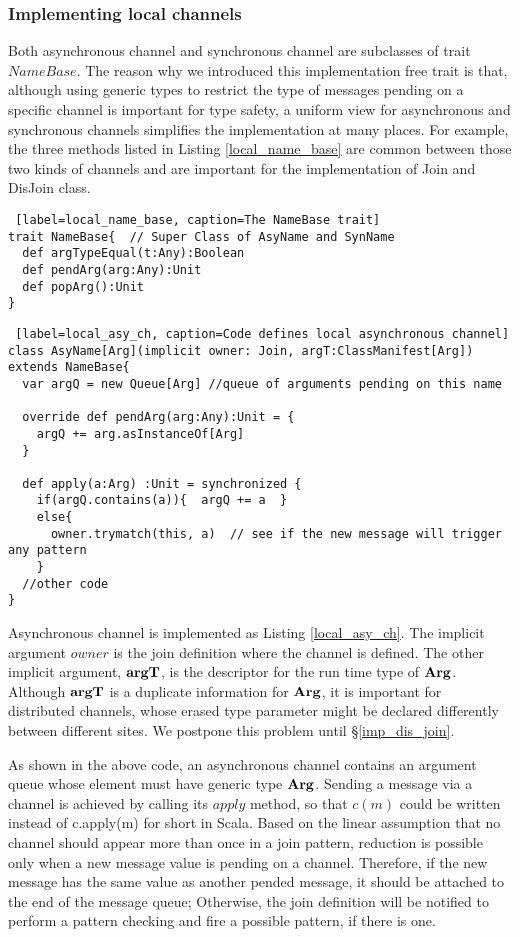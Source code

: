 \subsubsection{Implementing local channels}
\label{imp_loc_join}
Both asynchronous channel and synchronous channel are subclasses of trait $NameBase$.  The reason why we introduced this implementation free trait is that, although using generic types to restrict the type of messages pending on a specific channel is important for type safety, a uniform view for asynchronous and synchronous channels simplifies the implementation at many places.  For example, the three methods listed in Listing \ref{local_name_base} are common between those two kinds of channels and are important for the implementation of Join and DisJoin class.

\begin{lstlisting} [label=local_name_base, caption=The NameBase trait]
trait NameBase{  // Super Class of AsyName and SynName
  def argTypeEqual(t:Any):Boolean
  def pendArg(arg:Any):Unit
  def popArg():Unit
}
\end{lstlisting}

\begin{lstlisting} [label=local_asy_ch, caption=Code defines local asynchronous channel]
class AsyName[Arg](implicit owner: Join, argT:ClassManifest[Arg]) extends NameBase{
  var argQ = new Queue[Arg] //queue of arguments pending on this name

  override def pendArg(arg:Any):Unit = {
    argQ += arg.asInstanceOf[Arg]
  }

  def apply(a:Arg) :Unit = synchronized { 
    if(argQ.contains(a)){  argQ += a  }
    else{
      owner.trymatch(this, a)  // see if the new message will trigger any pattern
    }
  //other code
}
\end{lstlisting}

Asynchronous channel is implemented as Listing \ref{local_asy_ch}.  The implicit argument $owner$ is the join definition where the channel is defined.  The other implicit argument, $\bf{argT}$, is the descriptor for the run time type of $\bf{Arg}$.  Although $\bf{argT}$ is a duplicate information for $\bf{Arg}$, it is important for distributed channels, whose erased type parameter might be declared differently between different sites.  We postpone this problem until  \S\ref{imp_dis_join}.

As shown in the above code, an asynchronous channel contains an argument queue whose element must have generic type $\bf{Arg}$.  Sending a message via a channel is achieved by calling its $apply$ method, so that $c(m)$ could be written instead of c.apply(m) for short in Scala.   Based on the linear assumption that no channel should appear more than once in a join pattern, reduction is possible only when a new message value is pending on a channel.  Therefore, if the new message has the same value as another pended message, it should be attached to the end of the message queue;  Otherwise, the join definition will be notified to perform a pattern checking and fire a possible pattern, if there is one.

